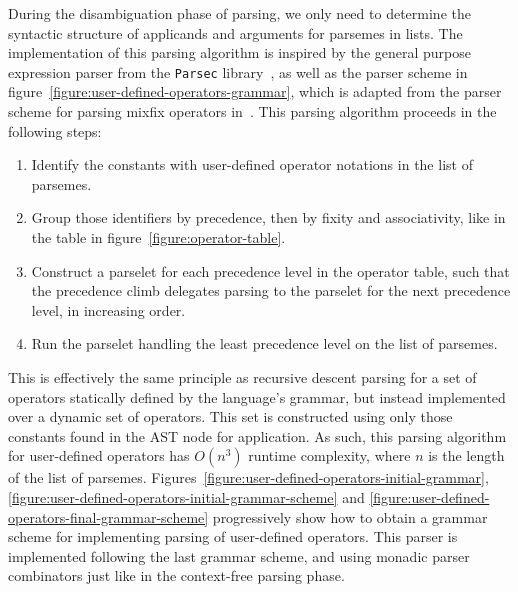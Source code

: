 During the disambiguation phase of parsing, we only need to determine the syntactic structure of applicands and arguments for parsemes in lists.
The implementation of this parsing algorithm is inspired by the general purpose expression parser from the \texttt{Parsec} library~\cite{leijen2001parsec}, as well as the parser scheme in figure~\ref{figure:user-defined-operators-grammar}, which is adapted from the parser scheme for parsing mixfix operators in~\cite{danielsson2008parsing}.
This parsing algorithm proceeds in the following steps:
\begin{enumerate}
\item Identify the constants with user-defined operator notations in the list of parsemes.
\item Group those identifiers by precedence, then by fixity and associativity, like in the table in figure~\ref{figure:operator-table}.
\item Construct a parselet for each precedence level in the operator table, such that the precedence climb delegates parsing to the parselet for the next precedence level, in increasing order.
\item Run the parselet handling the least precedence level on the list of parsemes.
\end{enumerate}
This is effectively the same principle as recursive descent parsing for a set of operators statically defined by the language's grammar, but instead implemented over a dynamic set of operators.
This set is constructed using only those constants found in the \ac{AST} node for application.
As such, this parsing algorithm for user-defined operators has $ O(n^3) $ runtime complexity, where $ n $ is the length of the list of parsemes.
Figures~\ref{figure:user-defined-operators-initial-grammar}, \ref{figure:user-defined-operators-initial-grammar-scheme} and \ref{figure:user-defined-operators-final-grammar-scheme} progressively show how to obtain a grammar scheme for implementing parsing of user-defined operators.
This parser is implemented following the last grammar scheme, and using monadic parser combinators just like in the context-free parsing phase.

